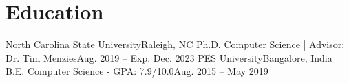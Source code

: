 \section{Education}
  \resumeSubHeadingListStart
    \resumeSubheading
      {North Carolina State University}{Raleigh, NC}
      {Ph.D. Computer Science | Advisor: Dr. Tim Menzies}{Aug. 2019 -- Exp. Dec. 2023}
    \resumeSubheading
      {PES University}{Bangalore, India}
      {B.E. Computer Science - GPA: 7.9/10.0}{Aug. 2015 -- May 2019}
  \resumeSubHeadingListEnd